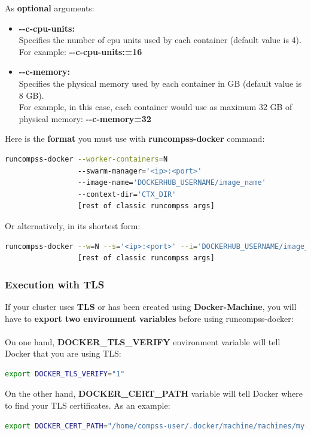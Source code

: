 As \textbf{optional} arguments:
\begin{itemize}
 \item { 
 \textbf{-{}-c-cpu-units:} \\
 Specifies the number of cpu units used by each container (default value is 4). \\
 For example: \textbf{-{}-c-cpu-units:=16}
 }
 
 \item { 
 \textbf{-{}-c-memory:} \\
 Specifies the physical memory used by each container in GB (default value is 8 GB).\\
 For example, in this case, each container would use as maximum 32 GB of physical memory: \textbf{-{}-c-memory=32}
 }
\end{itemize}

Here is the \textbf{format} you must use with \textbf{runcompss-docker} command:
\begin{lstlisting}[language=bash]
runcompss-docker --worker-containers=N
                 --swarm-manager='<ip>:<port>'
                 --image-name='DOCKERHUB_USERNAME/image_name'
                 --context-dir='CTX_DIR'
                 [rest of classic runcompss args]
\end{lstlisting}           

Or alternatively, in its shortest form:
\begin{lstlisting}[language=bash]
runcompss-docker --w=N --s='<ip>:<port>' --i='DOCKERHUB_USERNAME/image_name' --c='CTX_DIR'
                 [rest of classic runcompss args]
\end{lstlisting}        


\clearpage
\subsubsection{Execution with TLS}
If your cluster uses \textbf{TLS} or has been created using \textbf{Docker-Machine}, you will have to 
\textbf{export two environment variables} before using runcompss-docker:\\ \\
On one hand, \textbf{DOCKER\_TLS\_VERIFY} environment variable will tell Docker that you are using TLS:
\begin{lstlisting}[language=bash]
export DOCKER_TLS_VERIFY="1"
\end{lstlisting}
On the other hand, \textbf{DOCKER\_CERT\_PATH} variable will tell Docker where to find your TLS certificates. As an example:
\begin{lstlisting}[language=bash]
export DOCKER_CERT_PATH="/home/compss-user/.docker/machine/machines/my-manager-node"
\end{lstlisting}

